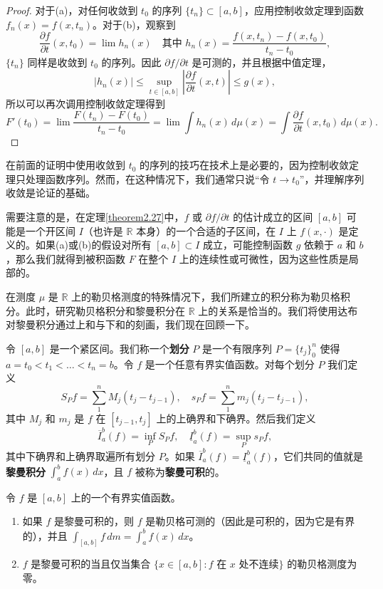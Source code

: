 \documentclass[lang=cn,10pt,thmcnt=section]{elegantbook}
\begin{document}
\begin{proof}
对于(a)，对任何收敛到 $t_0$ 的序列 $\{t_n\} \subset [a,b]$，应用控制收敛定理到函数 $f_n(x) = f(x,t_n)$。对于(b)，观察到
\[ \frac{\partial f}{\partial t}(x, t_0) = \lim h_n(x) \quad \text{其中 } h_n(x) = \frac{f(x, t_n) - f(x, t_0)}{t_n - t_0}, \]
$\{t_n\}$ 同样是收敛到 $t_0$ 的序列。因此 $\partial f/\partial t$ 是可测的，并且根据中值定理，
\[ |h_n(x)| \le \sup_{t \in [a,b]} \left|\frac{\partial f}{\partial t}(x,t)\right| \le g(x), \]
所以可以再次调用控制收敛定理得到
\[ F'(t_0) = \lim \frac{F(t_n) - F(t_0)}{t_n - t_0} = \lim \int h_n(x) \,d\mu(x) = \int \frac{\partial f}{\partial t}(x,t_0) \,d\mu(x). \]
\end{proof}

在前面的证明中使用收敛到 $t_0$ 的序列的技巧在技术上是必要的，因为控制收敛定理只处理函数序列。然而，在这种情况下，我们通常只说“令 $t \to t_0$”，并理解序列收敛是论证的基础。

需要注意的是，在定理\ref{theorem2.27}中，$f$ 或 $\partial f/\partial t$ 的估计成立的区间 $[a,b]$ 可能是一个开区间 $I$（也许是 $\mathbb{R}$ 本身）的一个合适的子区间，在 $I$ 上 $f(x,\cdot)$ 是定义的。如果(a)或(b)的假设对所有 $[a,b] \subset I$ 成立，可能控制函数 $g$ 依赖于 $a$ 和 $b$，那么我们就得到被积函数 $F$ 在整个 $I$ 上的连续性或可微性，因为这些性质是局部的。

在测度 $\mu$ 是 $\mathbb{R}$ 上的勒贝格测度的特殊情况下，我们所建立的积分称为勒贝格积分。此时，研究勒贝格积分和黎曼积分在 $\mathbb{R}$ 上的关系是恰当的。我们将使用达布对黎曼积分通过上和与下和的刻画，我们现在回顾一下。

令 $[a,b]$ 是一个紧区间。我们称一个\textbf{划分} $P$ 是一个有限序列 $P=\{t_j\}_0^n$ 使得 $a=t_0 < t_1 < \dots < t_n=b$。令 $f$ 是一个任意有界实值函数。对每个划分 $P$ 我们定义
\[ S_P f = \sum_1^n M_j(t_j-t_{j-1}), \quad s_P f = \sum_1^n m_j(t_j-t_{j-1}), \]
其中 $M_j$ 和 $m_j$ 是 $f$ 在 $[t_{j-1}, t_j]$ 上的上确界和下确界。然后我们定义
\[ \overline{I}_a^b(f) = \inf_P S_P f, \quad \underline{I}_a^b(f) = \sup_P s_P f, \]
其中下确界和上确界取遍所有划分 $P$。如果 $\overline{I}_a^b(f) = \underline{I}_a^b(f)$，它们共同的值就是\textbf{黎曼积分} $\int_a^b f(x)\,dx$，且 $f$ 被称为\textbf{黎曼可积}的。

\begin{theorem}\label{theorem2.28}
令 $f$ 是 $[a,b]$ 上的一个有界实值函数。
\begin{enumerate}[label=\alph*.]
    \item 如果 $f$ 是黎曼可积的，则 $f$ 是勒贝格可测的（因此是可积的，因为它是有界的），并且 $\int_{[a,b]} f \,dm = \int_a^b f(x)\,dx$。
    \item $f$ 是黎曼可积的当且仅当集合 $\{x \in [a,b] : f \text{ 在 } x \text{ 处不连续}\}$ 的勒贝格测度为零。
\end{enumerate}
\end{theorem}
\end{document}

